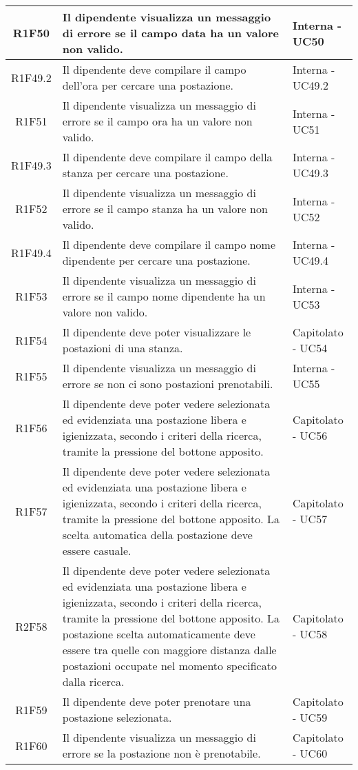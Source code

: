 \begin{center}
\begin{longtable}{|c|p{10cm}|p{4cm}|}
		\hline
		R1F50&Il dipendente visualizza un messaggio di errore se il campo data ha un valore non valido.	&Interna - UC50	\\
		\hline
		R1F49.2&Il dipendente deve compilare il campo dell'ora per cercare una postazione.	&Interna - UC49.2	\\
		\hline
		R1F51&Il dipendente visualizza un messaggio di errore se il campo ora ha un valore non valido.	&Interna - UC51	\\
		\hline
		R1F49.3&Il dipendente deve compilare il campo della stanza per cercare una postazione.		&Interna - UC49.3	\\
		\hline
		R1F52&Il dipendente visualizza un messaggio di errore se il campo stanza ha un valore non valido.	&Interna - UC52	\\
		\hline
		R1F49.4&Il dipendente deve compilare il campo nome dipendente per cercare una postazione.	&Interna - UC49.4	\\
		\hline
		R1F53&Il dipendente visualizza un messaggio di errore se il campo nome dipendente ha un valore non valido.	&Interna - UC53	\\
		\hline
		R1F54&Il dipendente deve poter visualizzare le postazioni di una stanza.	&Capitolato - UC54	\\
		\hline
		R1F55&Il dipendente visualizza un messaggio di errore se non ci sono postazioni prenotabili.	&Interna - UC55	\\
		\hline
		R1F56&Il dipendente deve poter vedere selezionata ed evidenziata una postazione libera e igienizzata, secondo i criteri della ricerca, tramite la pressione del bottone apposito.	&Capitolato - UC56	\\
		\hline
		R1F57&Il dipendente deve poter vedere selezionata ed evidenziata una postazione libera e igienizzata, secondo i criteri della ricerca, tramite la pressione del bottone apposito. La scelta automatica della postazione deve essere casuale. &Capitolato - UC57	\\
		\hline
		R2F58&Il dipendente deve poter vedere selezionata ed evidenziata una postazione libera e igienizzata, secondo i criteri della ricerca, tramite la pressione del bottone apposito. La postazione scelta automaticamente deve essere tra quelle con maggiore distanza dalle postazioni occupate nel momento specificato dalla ricerca.	&Capitolato - UC58	\\
		\hline
		R1F59&Il dipendente deve poter prenotare una postazione selezionata.	&Capitolato - UC59	\\
		\hline
		R1F60&Il dipendente visualizza un messaggio di errore se la postazione non è prenotabile.	&Capitolato - UC60	\\

\end{longtable}
\end{center}

